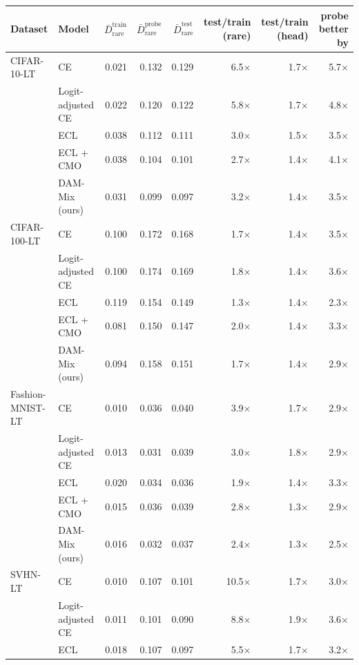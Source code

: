 \begin{tabular}{ll rrr rr r}
\toprule
Dataset & Model & $\bar D^{\mathrm{train}}_{\mathrm{rare}}$ & $\bar D^{\mathrm{probe}}_{\mathrm{rare}}$ & $\bar D^{\mathrm{test}}_{\mathrm{rare}}$ & test/train (rare) & test/train (head) & probe better by \\
\midrule
CIFAR-10-LT & CE & 0.021 & 0.132 & 0.129 & 6.5$\times$ & 1.7$\times$ & 5.7$\times$ \\
 & Logit-adjusted CE & 0.022 & 0.120 & 0.122 & 5.8$\times$ & 1.7$\times$ & 4.8$\times$ \\
 & ECL & 0.038 & 0.112 & 0.111 & 3.0$\times$ & 1.5$\times$ & 3.5$\times$ \\
 & ECL + CMO & 0.038 & 0.104 & 0.101 & 2.7$\times$ & 1.4$\times$ & 4.1$\times$ \\
 & DAM-Mix (ours) & 0.031 & 0.099 & 0.097 & 3.2$\times$ & 1.4$\times$ & 3.5$\times$ \\
\addlinespace
CIFAR-100-LT & CE & 0.100 & 0.172 & 0.168 & 1.7$\times$ & 1.4$\times$ & 3.5$\times$ \\
 & Logit-adjusted CE & 0.100 & 0.174 & 0.169 & 1.8$\times$ & 1.4$\times$ & 3.6$\times$ \\
 & ECL & 0.119 & 0.154 & 0.149 & 1.3$\times$ & 1.4$\times$ & 2.3$\times$ \\
 & ECL + CMO & 0.081 & 0.150 & 0.147 & 2.0$\times$ & 1.4$\times$ & 3.3$\times$ \\
 & DAM-Mix (ours) & 0.094 & 0.158 & 0.151 & 1.7$\times$ & 1.4$\times$ & 2.9$\times$ \\
\addlinespace
Fashion-MNIST-LT & CE & 0.010 & 0.036 & 0.040 & 3.9$\times$ & 1.7$\times$ & 2.9$\times$ \\
 & Logit-adjusted CE & 0.013 & 0.031 & 0.039 & 3.0$\times$ & 1.8$\times$ & 2.9$\times$ \\
 & ECL & 0.020 & 0.034 & 0.036 & 1.9$\times$ & 1.4$\times$ & 3.3$\times$ \\
 & ECL + CMO & 0.015 & 0.036 & 0.039 & 2.8$\times$ & 1.3$\times$ & 2.9$\times$ \\
 & DAM-Mix (ours) & 0.016 & 0.032 & 0.037 & 2.4$\times$ & 1.3$\times$ & 2.5$\times$ \\
\addlinespace
SVHN-LT & CE & 0.010 & 0.107 & 0.101 & 10.5$\times$ & 1.7$\times$ & 3.0$\times$ \\
 & Logit-adjusted CE & 0.011 & 0.101 & 0.090 & 8.8$\times$ & 1.9$\times$ & 3.6$\times$ \\
 & ECL & 0.018 & 0.107 & 0.097 & 5.5$\times$ & 1.7$\times$ & 3.2$\times$ \\

\end{tabular}
